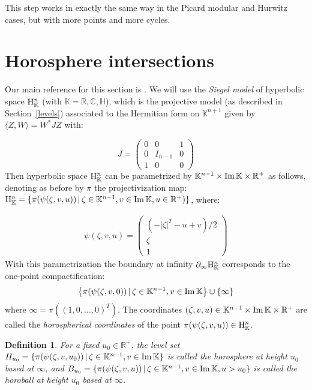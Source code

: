 \documentclass{article}[12pt]
\newcommand{\C}{\mathbb{C}}
\newcommand{\R}{\mathbb{R}}
\newcommand{\K}{\mathbb{K}}
\newcommand{\quat}{\mathbb{H}}
\newtheorem{dfn}{Definition}%
\begin{document}
This step works in exactly the same way in the Picard modular and Hurwitz cases, but with more points and more cycles.

\section{Horosphere intersections}\label{horosiegel}

Our main reference for this section is \cite{KP}. We will use the \emph{Siegel model} of hyperbolic space ${\rm H}_\K^n$ (with $\K=\R, \C, \quat$), which is the projective model (as described in Section~\ref{levels}) associated to the Hermitian form on $\K^{n+1}$ given by $\langle Z,W \rangle = W^* J Z$ with:

$$ J=\left(\begin{array}{ccc}
0 & 0 & 1 \\
0 & I_{n-1} & 0 \\
1 & 0 & 0 \end{array}\right)
$$
Then hyperbolic space ${\rm H}_\K^n$ can be parametrized by $\K^{n-1} \times {\rm Im} \, \K \times \R^+$ as follows, denoting as before by $\pi$ the projectivization map: ${\rm H}_\K^n=\{\pi(\psi(\zeta,v,u)) \, | \, \zeta \in \K^{n-1}, v \in {\rm Im}\,  \K, u \in \R^+)\}$, where: 

\begin{eqnarray}\label{horocoord}
\psi(\zeta,v,u)= \left(\begin{array}{c}
(-|\zeta|^2-u+v)/2 \\
\zeta \\
1
\end{array}\right)
\end{eqnarray}
With this parametrization the boundary at infinity $\partial_\infty {\rm H}_\K^n$ corresponds to the one-point compactification:
$$\left\{\pi(\psi(\zeta,v,0)) \, | \, \zeta \in \K^{n-1}, v \in {\rm Im}\,  \K \right\} \cup \{\infty\}$$
where $\infty=\pi((1,0,...,0)^T)$. The coordinates $(\zeta,v,u) \in \K^{n-1} \times {\rm Im}\, \K \times \R^+$ are called the \emph{horospherical coordinates} of the point $\pi(\psi(\zeta,v,u)) \in {\rm H}_\K^n$. 

\begin{dfn}\label{horo} For a fixed $u_0 \in \R^+$, the level set $H_{u_0}=\{\pi(\psi(\zeta,v,u_0)) \, | \, \zeta \in \K^{n-1}, v \in {\rm Im}\,  \K \}$ is called the \emph{horosphere at height $u_0$ based at $\infty$}, and $B_{u_0}=\{\pi(\psi(\zeta,v,u)) \, | \, \zeta \in \K^{n-1}, v \in {\rm Im}\,  \K, u > u_0 \}$ is called the \emph{horoball at height $u_0$ based at $\infty$}.
\end{dfn}
\end{document}
